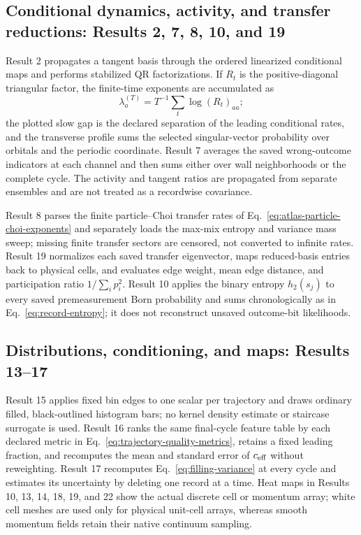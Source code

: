\documentclass[aps,prb,twocolumn,floatfix,nofootinbib,superscriptaddress]{revtex4-2}
\begin{document}
\subsection{Conditional dynamics, activity, and transfer reductions: Results 2, 7, 8, 10, and 19}

Result 2 propagates a tangent basis through the ordered linearized conditional maps and
performs stabilized QR factorizations.  If $R_t$ is the positive-diagonal triangular
factor, the finite-time exponents are accumulated as
\begin{equation}
 \lambda_a^{(T)}=T^{-1}\sum_t\log (R_t)_{aa};
 \label{eq:atlas-recipe-tangent}
\end{equation}
the plotted slow gap is the declared separation of the leading conditional rates, and
the transverse profile sums the selected singular-vector probability over orbitals and
the periodic coordinate.  Result 7 averages the saved wrong-outcome indicators at each
channel and then sums either over wall neighborhoods or the complete cycle.  The activity
and tangent ratios are propagated from separate ensembles and are not treated as a
recordwise covariance.

Result 8 parses the finite particle--Choi transfer rates of
Eq.~\eqref{eq:atlas-particle-choi-exponents} and separately loads the
max-mix entropy and variance mass sweep; missing finite transfer sectors are censored, not
converted to infinite rates.  Result 19 normalizes each saved transfer eigenvector,
maps reduced-basis entries back to physical cells, and evaluates edge weight, mean edge
distance, and participation ratio $1/\sum_i p_i^2$.  Result 10 applies the binary entropy
$h_2(s_j)$ to every saved premeasurement Born probability and sums chronologically as in
Eq.~\eqref{eq:record-entropy}; it does not reconstruct unsaved outcome-bit likelihoods.

\subsection{Distributions, conditioning, and maps: Results 13--17}

Result 15 applies fixed bin edges to one scalar per trajectory and draws ordinary filled,
black-outlined histogram bars; no kernel density estimate or staircase surrogate is used.
Result 16 ranks the same final-cycle feature table by each declared metric in
Eq.~\eqref{eq:trajectory-quality-metrics},
retains a fixed leading fraction, and recomputes the mean and standard error of
$c_{\rm eff}$ without reweighting.  Result 17 recomputes
Eq.~\eqref{eq:filling-variance} at every cycle and estimates its uncertainty by deleting
one record at a time.  Heat maps in
Results 10, 13, 14, 18, 19, and 22 show the actual discrete cell or momentum array;
white cell meshes are used only for physical unit-cell arrays, whereas smooth momentum
fields retain their native continuum sampling.
\end{document}
